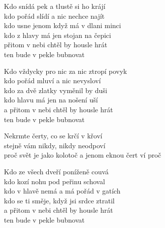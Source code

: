 
\ve{}
Kdo snídá pek a tlustě si ho krájí\\
kdo pořád slídí a nic nechce najít\\
kdo usne jenom když má v dlani minci\\
kdo z hlavy má jen stojan na čepici\\
přitom v nebi chtěl by housle hrát\\
ten bude v pekle bubnovat

\ve{}
Kdo vždycky pro nic za nic ztropí povyk\\
kdo pořád mluví a nic nevysloví\\
kdo za dvě zlatky vyměnil by duši\\
kdo hlavu má jen na nošení uší\\
a přitom v nebi chtěl by housle hrát\\
ten bude v pekle bubnovat

\cho{}
Nekrmte čerty, co se krčí v křoví\\
stejně vám nikdy, nikdy neodpoví\\
proč svět je jako kolotoč 
a jenom eknou 
čert ví proč 

\ve{}
Kdo ze všech dveří poníženě couvá\\
kdo kozí nohu pod peřinu schoval\\
kdo v hlavě nemá a má pořád v gatích\\
kdo se ti směje, když jsi srdce ztratil\\
a přitom v nebi chtěl by housle hrát\\
ten bude v pekle bubnovat

\cho{}

\esong{}